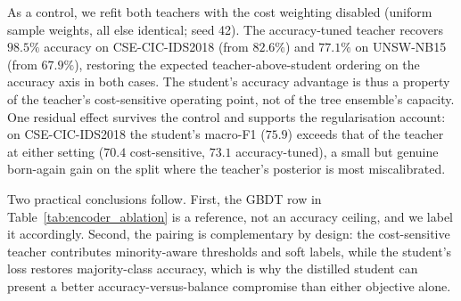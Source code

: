As a control, we refit both teachers with the cost weighting disabled
(uniform sample weights, all else identical; seed 42). The accuracy-tuned
teacher recovers $98.5\%$ accuracy on CSE-CIC-IDS2018 (from $82.6\%$) and
$77.1\%$ on UNSW-NB15 (from $67.9\%$), restoring the expected
teacher-above-student ordering on the accuracy axis in both cases. The
student's accuracy advantage is thus a property of the teacher's
cost-sensitive operating point, not of the tree ensemble's capacity. One
residual effect survives the control and supports the regularisation
account: on CSE-CIC-IDS2018 the student's macro-F1 ($75.9$) exceeds that of
the teacher at either setting ($70.4$ cost-sensitive, $73.1$
accuracy-tuned), a small but genuine born-again gain on the split where the
teacher's posterior is most miscalibrated.

Two practical conclusions follow. First, the GBDT row in
Table~\ref{tab:encoder_ablation} is a reference, not an accuracy ceiling,
and we label it accordingly. Second, the pairing is complementary by
design: the cost-sensitive teacher contributes minority-aware thresholds
and soft labels, while the student's loss restores majority-class accuracy,
which is why the distilled student can present a better
accuracy-versus-balance compromise than either objective alone.
